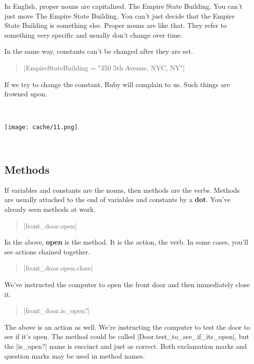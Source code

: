\documentclass[12pt,twoside]{report}
\begin{document}
In English, proper nouns are capitalized.  The Empire State Building.
You can't just move The Empire State Building.  You can't just decide
that the Empire State Building is something else. Proper nouns are
like that.  They refer to something very specific and usually don't
change over time.

In the same way, constants can't be changed after they are set.

\begin{quote}
\rubyinline|EmpireStateBuilding = "350 5th Avenue, NYC, NY"|\end{quote}


If we try to change the constant, Ruby will complain to us.  Such
things are frowned upon.

\ %

	\hspace{8.3cm}\texttt{[image: cache/11.png]}

\ %


\subsection{Methods}



If variables and constants are the nouns, then methods are the
verbs. Methods are usually attached to the end of variables and
constants by a {\bf dot}.  You've already seen methods at work.

\begin{quote}
\rubyinline|front_door.open|\end{quote}


In the above, {\bf open} is the method.  It is the action, the
verb. In some cases, you'll see actions chained together.

\begin{quote}
\rubyinline|front_door.open.close|\end{quote}


We've instructed the computer to open the front door and then
immediately close it.

\begin{quote}
\rubyinline|front_door.is_open?|\end{quote}


The above is an action as well.  We're instructing the computer to
test the door to see if it's open. The method could be called
\rubyinline|Door.test_to_see_if_its_open|, but the
\rubyinline|is_open?| name is succinct and just as
correct.  Both exclamation marks and question marks may be used in
method names.
\end{document}
